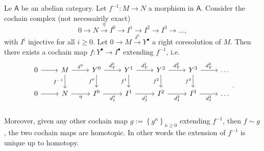 \begin{thm}[Comparison]
	Le $\mathsf{A}$ be an abelian category.
	Let $f^{-1}: M \to N$ a morphism in $\mathsf{A}$.
	Consider the cochain complex (not necessairily exact)
	\begin{equation}
	0 \to N \xrightarrow{\eta} I^0 \to I^1 \to I^2 \to I^3 \to \ldots
	,\end{equation} 
	with $I^i$ injective for all $i \geq 0$.
	Let $0 \to M \xrightarrow{\delta^0} Y^{\bullet}$ a right coresolution of $M$.
	Then there exists a cochain map $f: Y^\bullet \to I^\bullet$
	extending $f^{-1}$, i.e.
	\begin{equation}
	\begin{tikzcd}
		0 \arrow[r, "", rightarrow] &
		M \arrow[r, "\delta^0", rightarrow] \arrow[d, "f^{-1}"', rightarrow] &
		Y^0 \arrow[r, "d^0_Y", rightarrow] \arrow[d, "f^0"', rightarrow] &
		Y^1 \arrow[r, "d^1_Y", rightarrow] \arrow[d, "f^1"', rightarrow] &
		Y^2 \arrow[r, "d^2_Y", rightarrow] \arrow[d, "f^2"', rightarrow] &
		Y^3 \arrow[r, "d^3_Y", rightarrow] \arrow[d, "f^3"', rightarrow] &
		\ldots\\
		0 \arrow[r, "", rightarrow] &
		N \arrow[r, "\eta"', rightarrow] &
		I^0 \arrow[r, "d^0_I"', rightarrow] &
		I^1 \arrow[r, "d^1_I"', rightarrow] &
		I^2 \arrow[r, "d^2_I"', rightarrow] &
		I^3 \arrow[r, "d^3_I"', rightarrow] &
		\ldots\\
	\end{tikzcd}
	.\end{equation} 
	Moreover, given any other cochain map $g := \left\{ g^n \right\}_{n \geq 0}$ extending
	$f^{-1}$, then $f \sim g$, the two cochain maps are homotopic.
	In other words the extension of $f^{-1}$ is unique up to homotopy.
\end{thm}
